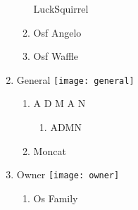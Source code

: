 \documentclass{article}
\begin{document}
\begin{enumerate}[I]
\begin{enumerate}[I]
	LuckSquirrel
      \item
	Osf Angelo
      \item
	Osf Waffle
    \end{enumerate}
  \item
    General \texttt{[image: general]}
    \begin{enumerate}[I]
      \item
	A D M A N
	\begin{enumerate}[I]
	  \item
	    A\textunderscore D\textunderscore M\textunderscore N
	\end{enumerate}
      \item
	Moncat
    \end{enumerate}
  \item
    Owner \texttt{[image: owner]}
    \begin{enumerate}[I]
      \item
	Os Family
    \end{enumerate}
\end{enumerate}
\end{document}
